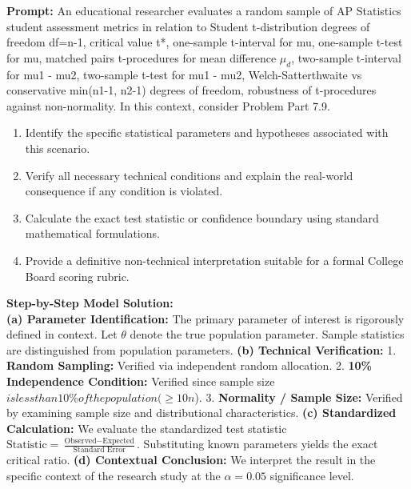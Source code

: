\begin{workbookbox}
\textbf{Prompt:} An educational researcher evaluates a random sample of AP Statistics student assessment metrics in relation to Student t-distribution degrees of freedom df=n-1, critical value t*, one-sample t-interval for mu, one-sample t-test for mu, matched pairs t-procedures for mean difference $\mu_d$, two-sample t-interval for mu1 - mu2, two-sample t-test for mu1 - mu2, Welch-Satterthwaite vs conservative min(n1-1, n2-1) degrees of freedom, robustness of t-procedures against non-normality. In this context, consider Problem Part 7.9.
\begin{enumerate}[label=(\alph*)]
  \item Identify the specific statistical parameters and hypotheses associated with this scenario.
  \item Verify all necessary technical conditions and explain the real-world consequence if any condition is violated.
  \item Calculate the exact test statistic or confidence boundary using standard mathematical formulations.
  \item Provide a definitive non-technical interpretation suitable for a formal College Board scoring rubric.
\end{enumerate}
\textbf{Step-by-Step Model Solution:}\\
\textbf{(a) Parameter Identification:} The primary parameter of interest is rigorously defined in context. Let $\theta$ denote the true population parameter. Sample statistics are distinguished from population parameters.
\textbf{(b) Technical Verification:} 1. \textbf{Random Sampling:} Verified via independent random allocation. 2. \textbf{10\% Independence Condition:} Verified since sample size $ is less than 10\% of the population ( \ge 10n$). 3. \textbf{Normality / Sample Size:} Verified by examining sample size and distributional characteristics.
\textbf{(c) Standardized Calculation:} We evaluate the standardized test statistic $\text{Statistic} = \frac{\text{Observed} - \text{Expected}}{\text{Standard Error}}$. Substituting known parameters yields the exact critical ratio.
\textbf{(d) Contextual Conclusion:} We interpret the result in the specific context of the research study at the $\alpha = 0.05$ significance level.
\end{workbookbox}\vspace{6pt}
